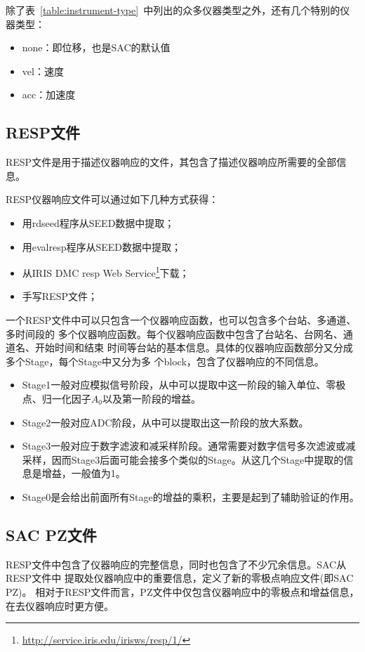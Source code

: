 除了表~\ref{table:instrument-type}~中列出的众多仪器类型之外，还有几个特别的仪器类型：
\begin{itemize}
\item none：即位移，也是SAC的默认值
\item vel：速度
\item acc：加速度
\end{itemize}

\subsection{RESP文件}
RESP文件是用于描述仪器响应的文件，其包含了描述仪器响应所需要的全部信息。

RESP仪器响应文件可以通过如下几种方式获得：
\begin{itemize}
\item 用rdseed程序从SEED数据中提取；
\item 用evalresp程序从SEED数据中提取；
\item 从IRIS DMC resp Web Service\footnote{\url{http://service.iris.edu/irisws/resp/1/}}下载；
\item 手写RESP文件；
\end{itemize}

一个RESP文件中可以只包含一个仪器响应函数，也可以包含多个台站、多通道、多时间段的
多个仪器响应函数。每个仪器响应函数中包含了台站名、台网名、通道名、开始时间和结束
时间等台站的基本信息。具体的仪器响应函数部分又分成多个Stage，每个Stage中又分为多
个block，包含了仪器响应的不同信息。

\begin{itemize}
\item Stage1一般对应模拟信号阶段，从中可以提取中这一阶段的输入单位、零极点、归一化因子$A_0$以及第一阶段的增益。
\item Stage2一般对应ADC阶段，从中可以提取出这一阶段的放大系数。
\item Stage3一般对应于数字滤波和减采样阶段。通常需要对数字信号多次滤波或减采样，因而Stage3后面可能会接多个类似的Stage。从这几个Stage中提取的信息是增益，一般值为1。
\item Stage0是会给出前面所有Stage的增益的乘积，主要是起到了辅助验证的作用。
\end{itemize}

\subsection{SAC PZ文件}
RESP文件中包含了仪器响应的完整信息，同时也包含了不少冗余信息。SAC从RESP文件中
提取处仪器响应中的重要信息，定义了新的零极点响应文件(即SAC PZ)。
相对于RESP文件而言，PZ文件中仅包含仪器响应中的零极点和增益信息，在去仪器响应时更方便。

